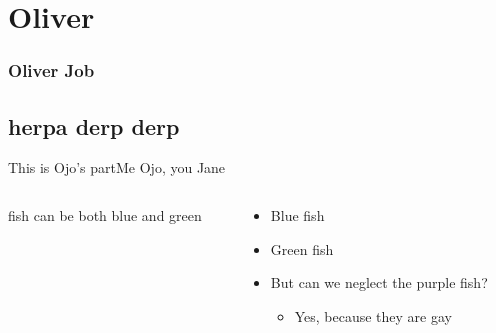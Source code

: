 \section{Oliver}
\begin{frame}
	\frametitle{Oliver Job}
	\tableofcontents[currentsection]
\end{frame}
\subsection{herpa derp derp}
\begin{frame}{This is Ojo's part}{Me Ojo, you Jane}		
	\begin{columns}
		\begin{column}{0.5\textwidth}
		fish can be both blue and green	
		\end{column}
		\begin{column}{0.5\textwidth} 
		\begin{itemize}
			\item<1-> Blue fish
			\item<2-> Green fish
			\item<3-> But can we neglect the purple fish?
			\begin{itemize}
				\item<4-> Yes, because they are gay
			\end{itemize}			
		\end{itemize}		
		\end{column}
	\end{columns}
\end{frame}